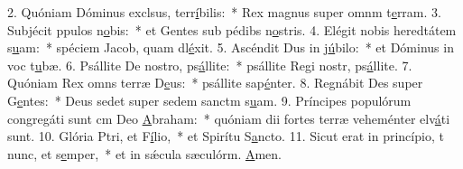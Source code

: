 2. Quóniam Dóminus exclsus, terr\uline{í}bilis:~* Rex magnus super omnm t\uline{e}rram.
3. Subjécit ppulos n\uline{o}bis:~* et Gentes sub pédibs n\uline{o}stris.
4. Elégit nobis heredtátem s\uline{u}am:~* spéciem Jacob, quam dl\uline{é}xit.
5. Ascéndit Dus in j\uline{ú}bilo:~* et Dóminus in voc t\uline{u}bæ.
6. Psállite De nostro, ps\uline{á}llite:~* psállite Regi nostr, ps\uline{á}llite.
7. Quóniam Rex omns terræ D\uline{e}us:~* psállite sap\uline{é}nter.
8. Regnábit Des super G\uline{e}ntes:~* Deus sedet super sedem sanctm s\uline{u}am.
9. Príncipes populórum congregáti sunt cm Deo \uline{A}braham:~* quóniam dii fortes terræ veheménter elv\uline{á}ti sunt.
10. Glória Ptri, et F\uline{í}lio,~* et Spirítu S\uline{a}ncto.
11. Sicut erat in princípio, t nunc, et s\uline{e}mper,~* et in sǽcula sæculórm. \uline{A}men.
